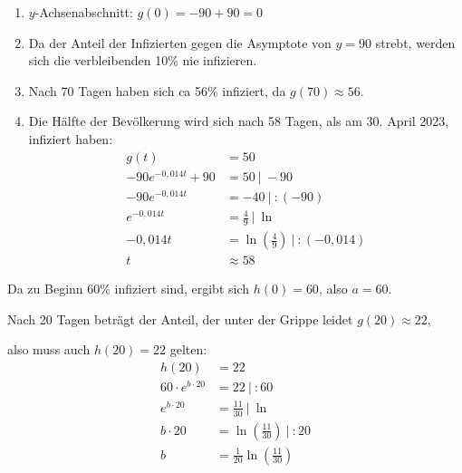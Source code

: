 \begin{Answer}[ref=eFktVA_7]
    \begin{enumerate}[label=\alph*)]
        \item \(y\)-Achsenabschnitt: \(g(0)=-90+90=0\)

        \item Da der Anteil der Infizierten gegen die Asymptote von \(y=90\) strebt, werden sich die verbleibenden 10\% nie infizieren.
        \item Nach 70 Tagen haben sich ca 56\% infiziert, da \(g(70)\approx 56\).
        \item Die Hälfte der Bevölkerung wird sich nach 58 Tagen, als am 30. April 2023, infiziert haben:
        \begin{align*}
            g(t)&=50\\
            -90e^{-0,014t}+90&=50\ \vert\ -90\\
            -90e^{-0,014t}&=-40\ \vert\ :(-90)\\
            e^{-0,014t}&=\frac{4}{9}\ \big\vert\ \ln\\
            -0,014t&=\ln\left(\frac{4}{9}\right)\ \big\vert\ :(-0,014)\\
            t&\approx58
        \end{align*}
    \end{enumerate}
    Da zu Beginn 60\% infiziert sind, ergibt sich \(h(0)=60\), also \(a=60\).

    Nach 20 Tagen beträgt der Anteil, der unter der Grippe leidet \(g(20)\approx22\),

    also muss auch \(h(20)=22\) gelten:
    \begin{align*}
        h(20)&=22\\
        60\cdot e^{b\cdot 20}&=22\ \vert\ :60\\
        e^{b\cdot 20}&=\frac{11}{30}\ \vert\ \ln\\
        b\cdot 20&=\ln\left(\frac{11}{30}\right)\ \vert\ :20\\
        b&=\frac{1}{20}\ln\left(\frac{11}{30}\right)
    \end{align*}
\end{Answer}
